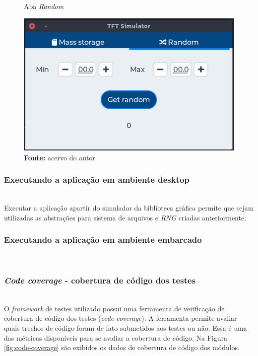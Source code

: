 \documentclass[times, twoside, watermark]{artigo}
\begin{document}
\begin{figure}[H]
  \centering
  \caption{Aba \textit{Random}}
  \includegraphics[width=0.95\linewidth]{images/random-screen.png}
  \caption*{\newline\textbf{Fonte:} acervo do autor}
  \label{fig:random}
\end{figure}

\subsubsection{Executando a aplicação em ambiente desktop}\hfill\\

Executar a aplicação apartir do simulador da biblioteca gráfica permite que sejam
utilizadas as abstrações para sistema de arquivos e \textit{RNG} criadas 
anteriormente.

\subsubsection{Executando a aplicação em ambiente embarcado}\hfill\\


\subsubsection{\textit{Code coverage} - cobertura de código dos testes}\hfill\\

O \textit{framework} de testes utilizado possui uma ferramenta de verificação 
de cobertura de código dos testes (\textit{code coverage}). A ferramenta permite 
avaliar quais trechos de código foram de fato submetidos aos testes ou não.
Essa é uma das métricas disponíveis para se avaliar a cobertura de código.
Na Figura \ref{fig:code-coverage} são exibidos os dados de cobertura de código 
dos módulos. \hfill\\
\end{document}
